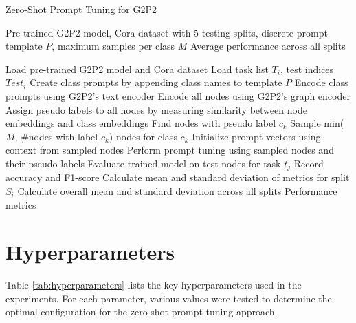 \documentclass[10pt,conference]{IEEEtran}
\begin{document}
\begin{algorithm}
\caption{Zero-Shot Prompt Tuning for G2P2}
\label{alg:zero-shot-prompt-tuning}
\begin{algorithmic}
\REQUIRE Pre-trained G2P2 model, Cora dataset with 5 testing splits, discrete prompt template $P$, maximum samples per class $M$
\ENSURE Average performance across all splits

\STATE Load pre-trained G2P2 model and Cora dataset
    \STATE Load task list $T_i$, test indices $Test_i$
        \STATE Create class prompts by appending class names to template $P$
        \STATE Encode class prompts using G2P2's text encoder
        \STATE Encode all nodes using G2P2's graph encoder
        \STATE Assign pseudo labels to all nodes by measuring similarity between node embeddings and class embeddings
            \STATE Find nodes with pseudo label $c_k$
            \STATE Sample min($M$, \#nodes with label $c_k$) nodes for class $c_k$
        \ENDFOR
        \STATE Initialize prompt vectors using context from sampled nodes
        \STATE Perform prompt tuning using sampled nodes and their pseudo labels
        \STATE Evaluate trained model on test nodes for task $t_j$
        \STATE Record accuracy and F1-score
    \ENDFOR
    \STATE Calculate mean and standard deviation of metrics for split $S_i$
\ENDFOR
\STATE Calculate overall mean and standard deviation across all splits
\RETURN Performance metrics
\end{algorithmic}
\end{algorithm}

\section{Hyperparameters}

Table \ref{tab:hyperparameters} lists the key hyperparameters used in the experiments. For each parameter, various values were tested to determine the optimal configuration for the zero-shot prompt tuning approach.
\end{document}
